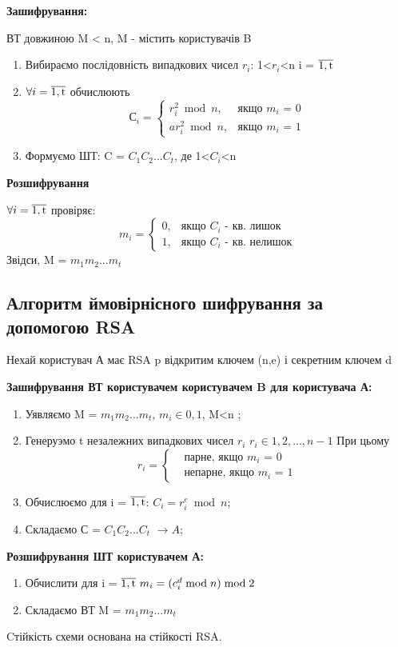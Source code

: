 \textbf{Зашифрування:}

ВТ довжиною M < n, M - містить користувачів B
\begin{enumerate}
\item Вибираємо послідовність випадкових чисел $r_{i}$: 1<$r_{i}$<n i = $\overline{\rm 1,t}	$ 

\item $\forall i = \overline{\rm 1,t}$ обчислюють 
\begin{equation*}
С_{i}= 
\begin{cases}
r_{i}^{2} \bmod n, &\text{якщо $m_{i}$ = 0}\\
a r_{i}^{2} \bmod n, &\text{якщо $m_{i}$ = 1}
\end{cases}
\end{equation*}

\item Формуємо ШТ: C = $C_{1}C_{2}...C_{t}$, де 1<$C_{i}$<n 
\end{enumerate}

\textbf{Розшифрування}

$\forall i = \overline{\rm 1,t}$ провіряє:
\begin{equation*}
m_{i}= 
\begin{cases}
	0, &\text{якщо $C_{i}$ - кв. лишок}\\
	1, &\text{якщо $C_{i}$ - кв. нелишок}
\end{cases}
\end{equation*}
Звідси, M = $m_{1}m_{2}...m_{t}$

\subsection {Алгоритм ймовірнісного шифрування за допомогою RSA}

Нехай користувач А має RSA p відкритим ключем  (n,e) і секретним ключем d

\textbf{Зашифрування ВТ користувачем користувачем B для користувача А:} 

\begin{enumerate}
	\item Уявляємо M = $m_{1}m_{2}...m_{t}$, $m_{i} \in {0,1}$, M<n ;
	\item Генеруэмо  t незалежних випадкових чисел $r_{i}$ $r_{i} \in {1,2,...,n-1}$
	При цьому 
\begin{equation*}
	r_{i}= 
	\begin{cases}
	&\text{парне, якщо $m_{i}$ = 0}\\
	&\text{непарне, якщо $m_{i}$ = 1}
	\end{cases}
\end{equation*}

	\item Обчислюємо для i = $\overline{\rm 1,t}$: $C_{i} = r_{i}^{e}\bmod n$;
	\item Складаємо С = $C_{1}C_{2}...C_{t}$ $\rightarrow A$;
\end{enumerate} 

\textbf{Розшифрування ШТ користувачем А:}
\begin{enumerate} 
\item Обчислити для i = $\overline{\rm 1,t}\ m_{i} = (c_{i}^{d}\bmod n)\bmod 2$

\item Складаємо ВТ M = $m_{1}m_{2}...m_{t}$
\end{enumerate}
Cтійкість схеми основана на стійкості RSA.

